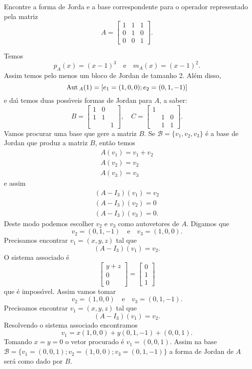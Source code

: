 \begin{enumerate}
	Encontre a forma de Jorda e a base correspondente para o operador representado pela matriz
	\[
		A = \begin{bmatrix}
			1 & 1 & 1\\
			0 & 1 & 0\\
			0 & 0 & 1
		\end{bmatrix}.
	\]
	\begin{solucao}
		Temos
		\[
			p_A(x) = (x - 1)^3 \quad \mbox{e}\quad m_A(x) = (x - 1)^2.
		\]
		Assim temos pelo menos um bloco de Jordan de tamanho 2. Al\'em disso,
		\[
			{\rm Aut\,}_A(1) = [e_1 = (1,0,0); e_2 = (0,1,-1)]
		\]
		e da{\'\i} temos duas poss{\'\i}veis formas de Jordan para $A$, a saber:
		\[
			B = \begin{bmatrix}
				1 & 0 &\\
				1 & 1 &\\
				& & 1
			\end{bmatrix},\quad
			C = \begin{bmatrix}
				 1 &  &\\
				 & 1 & 0\\
				 & 1 & 1
			\end{bmatrix}.
		\]
		Vamos procurar uma base que gere a matriz $B$. Se $\mathcal{B} = \{v_1, v_2, v_3\}$ \'e a base de Jordan que produz a matriz $B$, ent\~ao temos
		\begin{align*}
			A(v_1) = v_1 + v_2\\
			A(v_2) = v_2\\
			A(v_3) = v_3
		\end{align*}
		e assim
		\begin{align*}
			(A - I_3)(v_1) = v_2\\
			(A - I_3)(v_2) = 0\\
			(A - I_3)(v_3) = 0.
		\end{align*}
		Deste modo podemos escolher $v_2$ e $v_3$ como autovetores de $A$. Digamos que
		\[
			v_2 = (0,1,-1) \quad \mbox{e} \quad v_3 = (1,0,0).
		\]
		Precisamos encontrar $v_1 = (x,y,z)$ tal que
		\[
			(A - I_3)(v_1) = v_2.
		\]
		O sistema associado \'e
		\[
			\begin{bmatrix}
				y + z\\
				0\\
				0
			\end{bmatrix} = \begin{bmatrix}
				0\\
				1\\
				1
			\end{bmatrix}
		\]
		que \'e imposs{\'\i}vel. Assim vamos tomar
		\[
			v_2 = (1,0,0) \quad \mbox{e} \quad v_3 = (0,1,-1).
		\]
		Precisamos encontrar $v_1 = (x,y,z)$ tal que
		\[
			(A - I_3)(v_1) = v_2.
		\]
		Resolvendo o sistema associado encontramos
		\[
				v_1 = x(1,0,0) + y(0,1,-1) + (0,0,1).
		\]
		Tomando $x = y = 0$ o vetor procurado \'e $v_1 = (0,0,1)$. Assim na base $\mathcal{B} = \{v_1 = (0,0,1); v_2 = (1,0,0); v_3 = (0,1,-1)\}$ a forma de Jordan de $A$ ser\'a como dado por $B$.


\end{solucao}
\end{enumerate}

